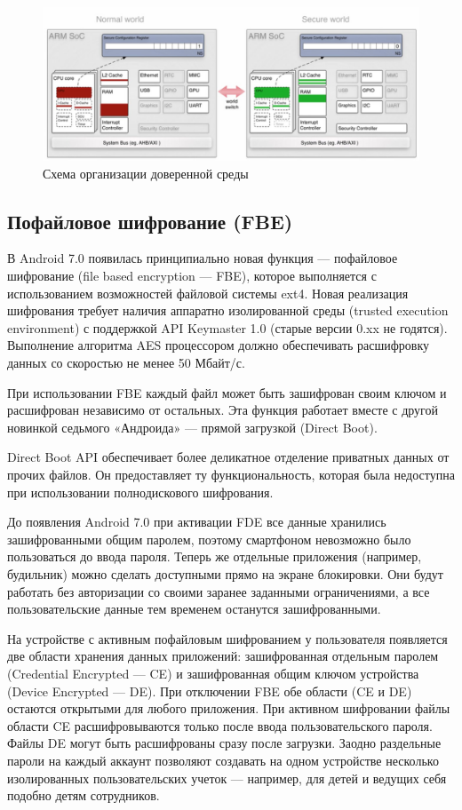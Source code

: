 \begin{figure}
    \centering
    \includegraphics[scale=0.3]{inc/trustzone.jpg}
    \caption{ Схема организации доверенной среды}
    \label{fig:fig02}
\end{figure}

\subsection*{Пофайловое шифрование (FBE)}

В Android 7.0 появилась принципиально новая функция — пофайловое шифрование
(file based encryption — FBE), которое выполняется с использованием
возможностей файловой системы ext4. Новая реализация шифрования требует наличия
аппаратно изолированной среды (trusted execution environment) с поддержкой API
Keymaster 1.0 (старые версии 0.xx не годятся). Выполнение алгоритма AES
процессором должно обеспечивать расшифровку данных со скоростью не менее 50
Мбайт/с.

При использовании FBE каждый файл может быть зашифрован своим ключом и
расшифрован независимо от остальных. Эта функция работает вместе с другой
новинкой седьмого «Андроида» — прямой загрузкой (Direct Boot).

Direct Boot API обеспечивает более деликатное отделение приватных данных от
прочих файлов. Он предоставляет ту функциональность, которая была недоступна
при использовании полнодискового шифрования.

До появления Android 7.0 при активации FDE все данные хранились зашифрованными
общим паролем, поэтому смартфоном невозможно было пользоваться до ввода пароля.
Теперь же отдельные приложения (например, будильник) можно сделать доступными
прямо на экране блокировки. Они будут работать без авторизации со своими
заранее заданными ограничениями, а все пользовательские данные тем временем
останутся зашифрованными.

На устройстве с активным пофайловым шифрованием у пользователя появляется две
области хранения данных приложений: зашифрованная отдельным паролем (Credential
Encrypted — CE) и зашифрованная общим ключом устройства (Device Encrypted —
DE). При отключении FBE обе области (CE и DE) остаются открытыми для любого
приложения. При активном шифровании файлы области CE расшифровываются только
после ввода пользовательского пароля. Файлы DE могут быть расшифрованы сразу
после загрузки. Заодно раздельные пароли на каждый аккаунт позволяют создавать
на одном устройстве несколько изолированных пользовательских учеток — например,
для детей и ведущих себя подобно детям сотрудников.

